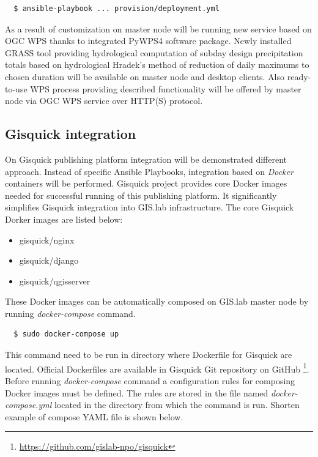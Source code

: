 \documentclass{isprs}
\begin{document}
\begin{lstlisting}
  $ ansible-playbook ... provision/deployment.yml
\end{lstlisting}

As a result of customization on master node will be running new
service based on OGC WPS thanks to integrated PyWPS4 software
package. Newly installed GRASS tool providing hydrological computation
of subday design precipitation totals based on hydrological Hradek's
method of reduction of daily maximums to chosen duration will be
available on master node and desktop clients. Also ready-to-use WPS
process providing described functionality will be offered by master
node via OGC WPS service over HTTP(S) protocol.

\subsection{Gisquick integration}

On Gisquick publishing platform integration will be demonstrated
different approach. Instead of specific Ansible Playbooks, integration
based on \textit{Docker} containers will be performed. Gisquick
project provides core Docker images needed for successful running of
this publishing platform. It significantly simplifies Gisquick
integration into GIS.lab infrastructure. The core Gisquick Dorker
images are listed below:

\begin{itemize}
\setlength\itemsep{0em}\setlength\parskip{0em}\setlength\topsep{0em}\setlength\partopsep{0em}\setlength\parsep{0em}
\item{gisquick/nginx}
\item{gisquick/django}
\item{gisquick/qgisserver}
\end{itemize}

These Docker images can be automatically composed on GIS.lab master
node by running \textit{docker-compose} command.

\begin{lstlisting}
  $ sudo docker-compose up
\end{lstlisting}

This command need to be run in directory where Dockerfile for Gisquick
are located. Official Dockerfiles are available in Gisquick Git
repository on GitHub
\footnote{\url{https://github.com/gislab-npo/gisquick}}. Before
running \textit{docker-compose} command a configuration rules for
composing Docker images must be defined. The rules are stored in the
file named \textit{docker-compose.yml} located in the directory from
which the command is run. Shorten example of compose YAML file is
shown below.
\end{document}
